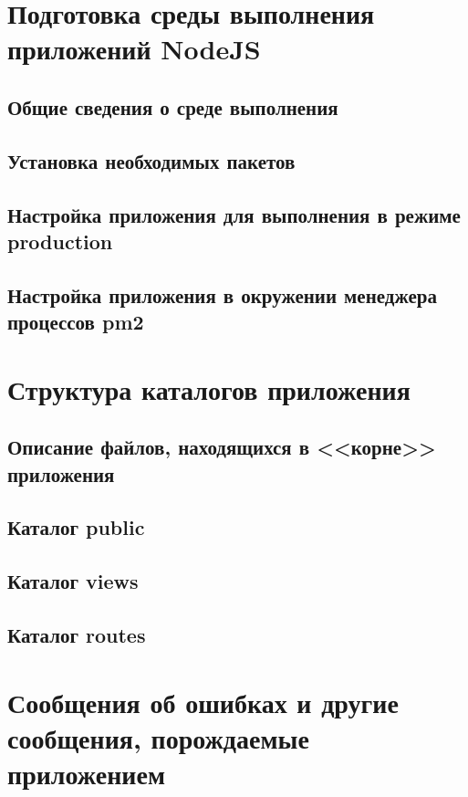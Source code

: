\documentclass[a4paper,12pt]{extreport}
\begin{document}

\tableofcontents
\newpage

\chapter{Подготовка среды выполнения приложений NodeJS}
	\section{Общие сведения о среде выполнения}
	\section{Установка необходимых пакетов}
	\section{Настройка приложения для выполнения в режиме production}
	\section{Настройка приложения в окружении менеджера процессов pm2}
\chapter{Структура каталогов приложения}
	\section{Описание файлов, находящихся в <<корне>> приложения}
	\section{Каталог public}
	\section{Каталог views}
	\section{Каталог routes}

\chapter{Сообщения об ошибках и другие сообщения, порождаемые приложением}

\end{document}
